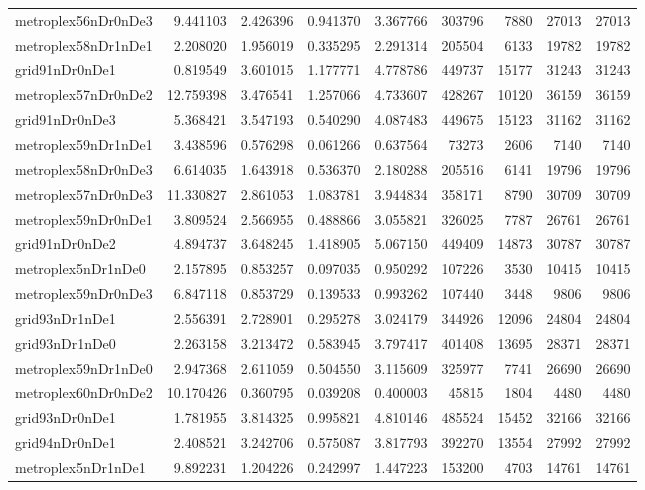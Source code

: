 \documentclass[../../../thesis.tex]{subfiles}
\begin{document}
\begin{longtable}{|l|r|r|r|r|r|r|r|r|}
metroplex56nDr0nDe3 & 9.441103 & 2.426396 & 0.941370 & 3.367766 & 303796 & 7880 & 27013 & 27013 \\
metroplex58nDr1nDe1 & 2.208020 & 1.956019 & 0.335295 & 2.291314 & 205504 & 6133 & 19782 & 19782 \\
grid91nDr0nDe1 & 0.819549 & 3.601015 & 1.177771 & 4.778786 & 449737 & 15177 & 31243 & 31243 \\
metroplex57nDr0nDe2 & 12.759398 & 3.476541 & 1.257066 & 4.733607 & 428267 & 10120 & 36159 & 36159 \\
grid91nDr0nDe3 & 5.368421 & 3.547193 & 0.540290 & 4.087483 & 449675 & 15123 & 31162 & 31162 \\
metroplex59nDr1nDe1 & 3.438596 & 0.576298 & 0.061266 & 0.637564 & 73273 & 2606 & 7140 & 7140 \\
metroplex58nDr0nDe3 & 6.614035 & 1.643918 & 0.536370 & 2.180288 & 205516 & 6141 & 19796 & 19796 \\
metroplex57nDr0nDe3 & 11.330827 & 2.861053 & 1.083781 & 3.944834 & 358171 & 8790 & 30709 & 30709 \\
metroplex59nDr0nDe1 & 3.809524 & 2.566955 & 0.488866 & 3.055821 & 326025 & 7787 & 26761 & 26761 \\
grid91nDr0nDe2 & 4.894737 & 3.648245 & 1.418905 & 5.067150 & 449409 & 14873 & 30787 & 30787 \\
metroplex5nDr1nDe0 & 2.157895 & 0.853257 & 0.097035 & 0.950292 & 107226 & 3530 & 10415 & 10415 \\
metroplex59nDr0nDe3 & 6.847118 & 0.853729 & 0.139533 & 0.993262 & 107440 & 3448 & 9806 & 9806 \\
grid93nDr1nDe1 & 2.556391 & 2.728901 & 0.295278 & 3.024179 & 344926 & 12096 & 24804 & 24804 \\
grid93nDr1nDe0 & 2.263158 & 3.213472 & 0.583945 & 3.797417 & 401408 & 13695 & 28371 & 28371 \\
metroplex59nDr1nDe0 & 2.947368 & 2.611059 & 0.504550 & 3.115609 & 325977 & 7741 & 26690 & 26690 \\
metroplex60nDr0nDe2 & 10.170426 & 0.360795 & 0.039208 & 0.400003 & 45815 & 1804 & 4480 & 4480 \\
grid93nDr0nDe1 & 1.781955 & 3.814325 & 0.995821 & 4.810146 & 485524 & 15452 & 32166 & 32166 \\
grid94nDr0nDe1 & 2.408521 & 3.242706 & 0.575087 & 3.817793 & 392270 & 13554 & 27992 & 27992 \\
metroplex5nDr1nDe1 & 9.892231 & 1.204226 & 0.242997 & 1.447223 & 153200 & 4703 & 14761 & 14761 \\

\end{longtable}
\end{document}
